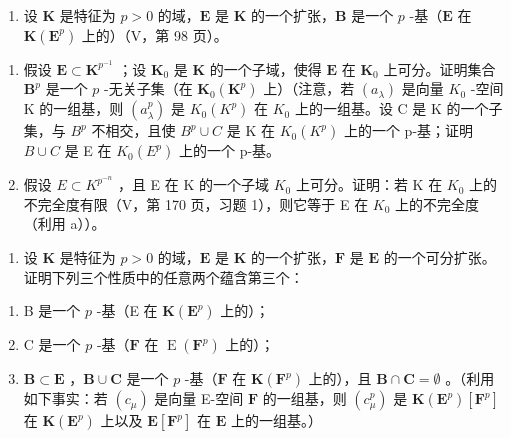\BourbakiExerciseGroup

\begin{enumerate}
\def\labelenumi{\arabic{enumi})}
\tightlist
\item
  设 \(\mathbf{K}\) 是特征为 \(p > 0\) 的域，\(\mathbf{E}\) 是 \(\mathbf{K}\) 的一个扩张，\(\mathbf{B}\) 是一个 \(p\) -基（\(\mathbf{E}\) 在 \(\mathbf{K}(\mathbf{E}^p)\) 上的）（V，第 98 页）。
\end{enumerate}

\begin{enumerate}
\def\labelenumi{\alph{enumi})}
\item
  假设 \(\mathbf{E} \subset \mathbf{K}^{p^{-1}}\) ；设 \(\mathbf{K}_0\) 是 \(\mathbf{K}\) 的一个子域，使得 \(\mathbf{E}\) 在 \(\mathbf{K}_0\) 上可分。证明集合 \(\mathbf{B}^p\) 是一个 \(p\) -无关子集（在 \(\mathbf{K}_0(\mathbf{K}^p)\) 上）（注意，若 \((a_{\lambda})\) 是向量 \(K_{0}\) -空间 K 的一组基，则 \((a_{\lambda}^{p})\) 是 \(K_{0}(K^{p})\) 在 \(K_{0}\) 上的一组基。设 C 是 K 的一个子集，与 \(B^{p}\) 不相交，且使 \(B^{p} \cup C\) 是 K 在 \(K_{0}(K^{p})\) 上的一个 p-基；证明 \(B \cup C\) 是 E 在 \(K_{0}(E^{p})\) 上的一个 p-基。
\item
  假设 \(E \subset K^{p^{-n}}\) ，且 E 在 K 的一个子域 \(K_{0}\) 上可分。证明：若 K 在 \(K_{0}\) 上的不完全度有限（V，第 170 页，习题 1），则它等于 E 在 \(K_{0}\) 上的不完全度（利用 a））。
\end{enumerate}

\begin{enumerate}
\def\labelenumi{\arabic{enumi})}
\setcounter{enumi}{1}
\tightlist
\item
  设 \(\mathbf{K}\) 是特征为 \(p > 0\) 的域，\(\mathbf{E}\) 是 \(\mathbf{K}\) 的一个扩张，\(\mathbf{F}\) 是 \(\mathbf{E}\) 的一个可分扩张。证明下列三个性质中的任意两个蕴含第三个：
\end{enumerate}

\begin{enumerate}
\def\labelenumi{\alph{enumi})}
\item
  B 是一个 \(p\) -基（E 在 \(\mathbf{K}(\mathbf{E}^p)\) 上的）；
\item
  C 是一个 \(p\) -基（\(\mathbf{F}\) 在 \(\operatorname{E}(\mathbf{F}^p)\) 上的）；
\item
  \(\mathbf{B} \subset \mathbf{E}\) ，\(\mathbf{B} \cup \mathbf{C}\) 是一个 \(p\) -基（\(\mathbf{F}\) 在 \(\mathbf{K}(\mathbf{F}^p)\) 上的），且 \(\mathbf{B} \cap \mathbf{C} = \emptyset\) 。（利用如下事实：若 \((c_{\mu})\) 是向量 E-空间 \(\mathbf{F}\) 的一组基，则 \((c_{\mu}^p)\) 是 \(\mathbf{K}(\mathbf{E}^p)[\mathbf{F}^p]\) 在 \(\mathbf{K}(\mathbf{E}^p)\) 上以及 \(\mathbf{E}[\mathbf{F}^p]\) 在 \(\mathbf{E}\) 上的一组基。）
\end{enumerate}


